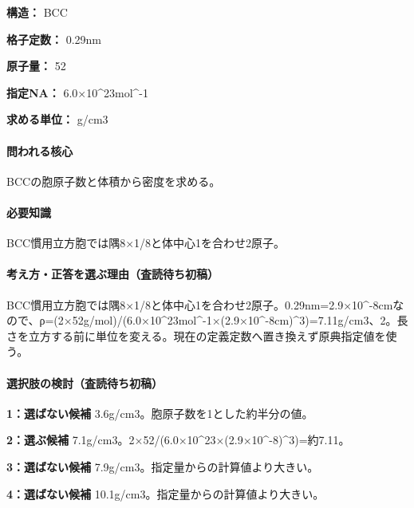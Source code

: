 \noindent\textbf{構造：} BCC\par

\noindent\textbf{格子定数：} 0.29nm\par

\noindent\textbf{原子量：} 52\par

\noindent\textbf{指定NA：} 6.0×10\textasciicircum{}23mol\textasciicircum{}-1\par

\noindent\textbf{求める単位：} g/cm3\par

\paragraph{問われる核心} BCCの胞原子数と体積から密度を求める。

\paragraph{必要知識} BCC慣用立方胞では隅8×1/8と体中心1を合わせ2原子。

\paragraph{考え方・正答を選ぶ理由（査読待ち初稿）} BCC慣用立方胞では隅8×1/8と体中心1を合わせ2原子。0.29nm=\allowbreak{}2.9×10\textasciicircum{}-8cmなので、ρ=(2×52g/mol)/(6.0×10\textasciicircum{}23mol\textasciicircum{}-1×(2.9×10\textasciicircum{}-8cm)\textasciicircum{}3)=\allowbreak{}7.11g/cm3、2。長さを立方する前に単位を変える。現在の定義定数へ置き換えず原典指定値を使う。

\paragraph{選択肢の検討（査読待ち初稿）}\mbox{}\par

\noindent\textbf{1：選ばない候補} 3.6g/cm3。胞原子数を1とした約半分の値。\par

\noindent\textbf{2：選ぶ候補} 7.1g/cm3。2×52/(6.0×10\textasciicircum{}23×(2.9×10\textasciicircum{}-8)\textasciicircum{}3)=約7.11。\par

\noindent\textbf{3：選ばない候補} 7.9g/cm3。指定量からの計算値より大きい。\par

\noindent\textbf{4：選ばない候補} 10.1g/cm3。指定量からの計算値より大きい。\par

